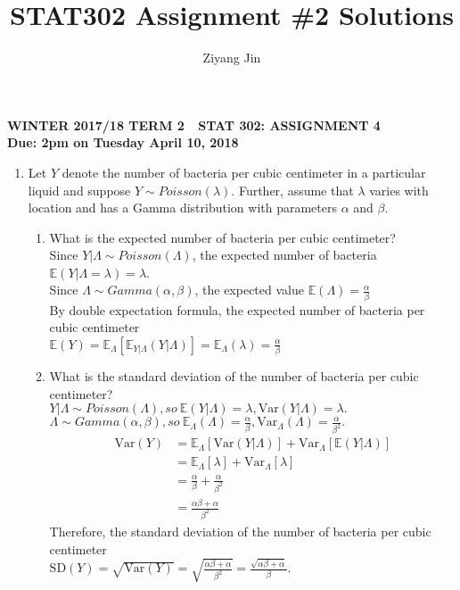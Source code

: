 \documentclass[11pt]{article}
\title{STAT302 Assignment \#2 Solutions}
\author{Ziyang Jin}
\newcommand{\e}{\mathbb{E}}
\newcommand{\var}{\text{Var}}
\newcommand{\sd}{\text{SD}}
\begin{document}
\begin{center}
\textbf{WINTER 2017/18 TERM 2  \,\, STAT 302: ASSIGNMENT 4 \\
Due: 2pm on Tuesday April 10, 2018}
\end{center}


\begin{enumerate}[label=\textbf{Question \arabic*:},start=1]


\item
Let $Y$ denote the number of bacteria per cubic centimeter in a particular liquid and suppose $Y\sim Poisson(\lambda)$. Further, assume that $\lambda$ varies with location and has a Gamma distribution with parameters $\alpha$ and $\beta$.
\begin{enumerate}
	\item What is the expected number of bacteria per cubic centimeter?\\
	
	Since $Y|\Lambda \sim Poisson(\Lambda)$, the expected number of bacteria $\e{(Y|\Lambda = \lambda)} = \lambda$.\\
	Since $\Lambda \sim Gamma(\alpha, \beta)$, the expected value $\e{(\Lambda)} = \frac{\alpha}{\beta}$ \\
	By double expectation formula, the expected number of bacteria per cubic centimeter \\
	$\e(Y) = \e_{\Lambda}[\e_{Y|\Lambda}(Y|\Lambda)] = \e_{\Lambda}(\lambda) = \frac{\alpha}{\beta}$\\

	\item What is the standard deviation of the number of bacteria per cubic centimeter?\\
	
	$Y|\Lambda \sim Poisson(\Lambda), so \ \e(Y|\Lambda) = \lambda, \var(Y|\Lambda) = \lambda.$ \\
	$\Lambda \sim Gamma(\alpha, \beta), so \ \e_{\Lambda}(\Lambda) = \frac{\alpha}{\beta}, \var_{\Lambda}(\Lambda) = \frac{\alpha}{\beta^2}.$
	\begin{align*}
	\var(Y) & = \e_{\Lambda}[\var(Y|\Lambda)] + \var_{\Lambda}[\e(Y|\Lambda)] \\
	& = \e_{\Lambda}[\lambda] + \var_{\Lambda}[\lambda] \\
	& = \frac{\alpha}{\beta} + \frac{\alpha}{\beta^2} \\
	& = \frac{\alpha \beta + \alpha}{\beta^2}
	\end{align*}
	Therefore, the standard deviation of the number of bacteria per cubic centimeter\\ $\sd(Y) = \sqrt{\var(Y)} = \sqrt{\frac{\alpha \beta + \alpha}{\beta^2}} = \frac{\sqrt{\alpha \beta + \alpha}}{\beta}$.\\


\end{enumerate}
\end{enumerate}
\end{document}
